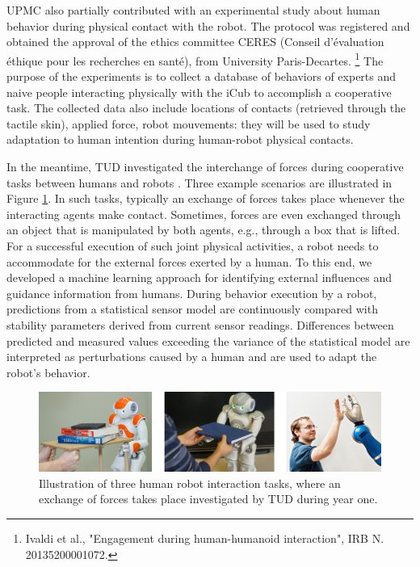 \documentclass[12pt,a4paper,twoside]{article}
\begin{document}
UPMC also partially contributed with an experimental study about human behavior during physical contact with the robot. The protocol was registered and obtained the approval of the ethics committee CERES (Conseil d’\'evaluation \'ethique pour les recherches en sant\'e), from University Paris-Decartes. \footnote{Ivaldi et al., "Engagement during human-humanoid interaction", IRB N. 20135200001072.}
The purpose of the experiments is to collect a database of behaviors of experts and naive people interacting physically with the iCub to accomplish a cooperative task. The collected data also include locations of contacts (retrieved through the tactile skin), applied force, robot mouvements: they will be used to study adaptation to human intention during human-robot physical contacts.
    
In the meantime, TUD investigated the interchange of forces during cooperative tasks between humans and robots \cite{berger2013}. Three example scenarios are illustrated in Figure \ref{fig:interaction_tasks}. In such tasks, typically an exchange of forces takes place whenever the interacting agents make contact. Sometimes, forces are even exchanged through an object that is manipulated by both agents, e.g., through a box that is lifted. For a successful execution of such joint physical activities, a robot needs to accommodate for the external forces exerted by a human. To this end, we developed a machine learning approach for identifying external influences and guidance information from humans. During behavior execution by a robot, predictions from a statistical sensor model are continuously compared with stability parameters derived from current sensor readings. Differences between predicted and measured values exceeding the variance of the statistical model are interpreted as perturbations caused by a human and are used to adapt the robot's behavior.
    
\begin{figure}[!ht]
\centering
\includegraphics[width=\textwidth]{./pics_tud/interaction_wp3.png}
 \caption{Illustration of three human robot interaction tasks, where an exchange of forces takes place investigated by TUD during year one.
}
\label{fig:interaction_tasks}
\end{figure}
\end{document}
